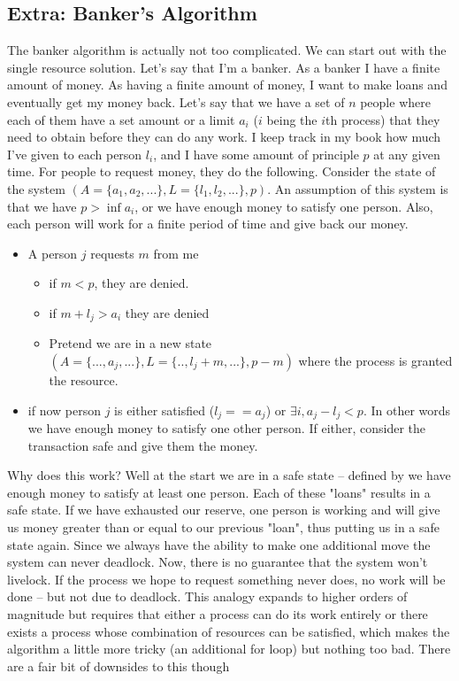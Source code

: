 \subsection{Extra: Banker's Algorithm}

The banker algorithm is actually not too complicated.
We can start out with the single resource solution.
Let's say that I'm a banker.
As a banker I have a finite amount of money.
As having a finite amount of money, I want to make loans and eventually get my money back.
Let's say that we have a set of $n$ people where each of them have a set amount or a limit $a_i$ ($i$ being the $i$th process) that they need to obtain before they can do any work.
I keep track in my book how much I've given to each person $l_i$, and I have some amount of principle $p$ at any given time.
For people to request money, they do the following. Consider the state of the system $(A=\{a_1, a_2, ...\}, L=\{l_1, l_2, ...\}, p)$.
An assumption of this system is that we have $p > \inf a_i$, or we have enough money to satisfy one person.
Also, each person will work for a finite period of time and give back our money.

\begin{itemize}
\item A person $j$ requests $m$ from me
\begin{itemize}
\item if $m < p$, they are denied.
\item if $m + l_j > a_i$ they are denied
\item Pretend we are in a new state $(A=\{..., a_j, ...\}, L=\{.., l_j + m, ...\}, p - m)$ where the process is granted the resource.
\end{itemize}
\item if now person $j$ is either satisfied ($l_j == a_j$) or $\exists i, a_j - l_j < p$. In other words we have enough money to satisfy one other person. If either, consider the transaction safe and give them the money.
\end{itemize}

Why does this work? Well at the start we are in a safe state -- defined by we have enough money to satisfy at least one person.
Each of these "loans" results in a safe state.
If we have exhausted our reserve, one person is working and will give us money greater than or equal to our previous "loan", thus putting us in a safe state again.
Since we always have the ability to make one additional move the system can never deadlock.
Now, there is no guarantee that the system won't livelock.
If the process we hope to request something never does, no work will be done -- but not due to deadlock.
This analogy expands to higher orders of magnitude but requires that either a process can do its work entirely or there exists a process whose combination of resources can be satisfied, which makes the algorithm a little more tricky (an additional for loop) but nothing too bad.
There are a fair bit of downsides to this though

